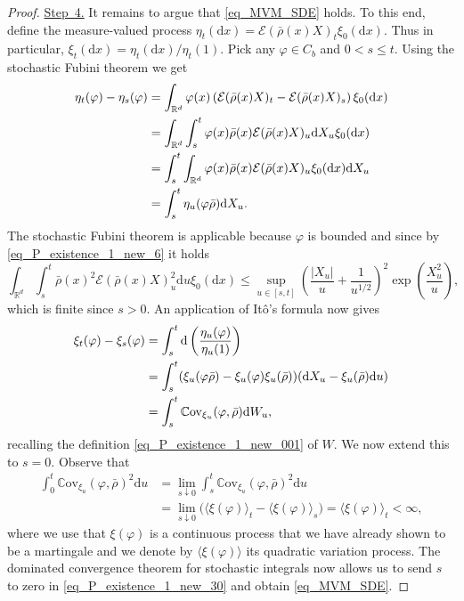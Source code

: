 \documentclass{article}
\theoremstyle{definition}
\numberwithin{equation}{section}
\numberwithin{theorem}{section}
\newcommand{\R}{\mathbb{R}}
\newcommand{\dx}{\mathrm{d}x}
\newcommand{\du}{\mathrm{d}u}
\newcommand{\Ec}{\mathcal{E}}
\newcommand{\Cov}{\mathbb{C}\mathrm{ov}}
\renewcommand{\d}{{\rm d}}
\begin{document}
\begin{proof}
\underline{Step~4.}
It remains to argue that \eqref{eq_MVM_SDE} holds. To this end, define the measure-valued process $\eta_t(\dx) = \Ec(\bar\rho(x)X)_t\xi_0(\dx)$. Thus in particular, $\xi_t(\dx)=\eta_t(\dx)/\eta_t(1)$. Pick any $\varphi\in C_b$ and $0<s\le t$. Using the stochastic Fubini theorem \cite[Theorem~2.2]{ver_12} we get
\begin{align*}
\eta_t(\varphi) - \eta_s(\varphi) &= \int_{\R^d} \varphi(x) \left( \Ec(\bar\rho(x) X)_t - \Ec(\bar\rho(x) X)_s \right) \xi_0(\dx) \\
&= \int_{\R^d}  \int_s^t \varphi(x)  \bar\rho(x) \Ec(\bar\rho(x)X)_u \d X_u \xi_0(\dx) \\
&= \int_s^t \int_{\R^d}  \varphi(x)  \bar\rho(x) \Ec(\bar\rho(x)X)_u \xi_0(\dx) \d X_u \\
&= \int_s^t \eta_u( \varphi \bar\rho )  \d X_u.
\end{align*}
The stochastic Fubini theorem is applicable because $\varphi$ is bounded and since by \eqref{eq_P_existence_1_new_6} it holds
\[
\int_{\R^d} \int_s^t \bar\rho(x)^2 \Ec(\bar\rho(x)X)_u^2 \du \xi_0(\dx)
\leq\sup_{u\in[s,t]}  \left(\frac{|X_u|}{u} + \frac{1}{u^{1/2}} \right)^2 \exp\left( \frac{X_u^2}{u} \right),
\]
which is finite since $s>0$.
An application of It\^o's formula now gives
\begin{align}
\xi_t(\varphi)-\xi_s(\varphi) &= \int_s^t \d\left( \frac{\eta_u(\varphi)}{\eta_u(1)}\right) \notag\\
&= \int_s^t (\xi_u(\varphi\bar\rho) - \xi_u(\varphi)\xi_u(\bar\rho))(\d X_u - \xi_u(\bar\rho)\du) \notag\\
&= \int_s^t \Cov_{\xi_u}(\varphi,\bar\rho)\d W_u, \label{eq_P_existence_1_new_30}
\end{align}
recalling the definition \eqref{eq_P_existence_1_new_001} of $W$. We now extend this to $s=0$. Observe that
\begin{align*}
\int_0^t \Cov_{\xi_u}(\varphi,\bar\rho)^2 \du &= \lim_{s\downarrow 0} \int_s^t \Cov_{\xi_u}(\varphi,\bar\rho)^2 \du \\
&= \lim_{s\downarrow 0} \Big( \langle \xi(\varphi) \rangle_t -  \langle \xi(\varphi) \rangle_s \Big) = \langle \xi(\varphi) \rangle_t < \infty,
\end{align*}
where we use that $\xi(\varphi)$ is a continuous process that we have already shown to be a martingale and we denote by $ \langle \xi(\varphi) \rangle$ its quadratic variation process. The dominated convergence theorem for stochastic integrals now allows us to send $s$ to zero in \eqref{eq_P_existence_1_new_30} and obtain \eqref{eq_MVM_SDE}.
\end{proof}
\end{document}
